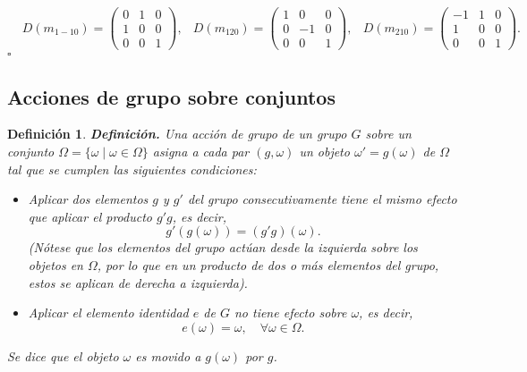 \documentclass{report}
\newtheorem{definition}{Definición}
\begin{document}
{\[\begin{array}{cccc}
&
D(m_{1-10}) = 
\begin{pmatrix} 
0 & 1 & 0 \\ 
1 & 0 & 0 \\ 
0 & 0 & 1 
\end{pmatrix},
&
D(m_{120}) = 
\begin{pmatrix} 
1 & 0 & 0 \\ 
0 & -1 & 0 \\ 
0 & 0 & 1 
\end{pmatrix},
&
D(m_{210}) = 
\begin{pmatrix} 
-1 & 1 & 0 \\ 
1 & 0 & 0 \\ 
0 & 0 & 1 
\end{pmatrix}.
\end{array}
\]
}
\hfill $\square$
\vspace{.4cm}
\subsection{Acciones de grupo sobre conjuntos}

\begin{definition}
\textbf{Definición.} Una \textit{acción de grupo} de un grupo \( G \) sobre un conjunto \( \Omega = \{ \omega \mid \omega \in \Omega \} \) asigna a cada par \( (g, \omega) \) un objeto \( \omega' = g(\omega) \) de \( \Omega \) tal que se cumplen las siguientes condiciones:

\begin{itemize}
    \item[(i)] Aplicar dos elementos \( g \) y \( g' \) del grupo consecutivamente tiene el mismo efecto que aplicar el producto \( g' g \), es decir, 
    \[
    g'(g(\omega)) = (g' g)(\omega).
    \]
    (Nótese que los elementos del grupo actúan \textit{desde la izquierda} sobre los objetos en \( \Omega \), por lo que en un producto de dos o más elementos del grupo, estos se aplican de derecha a izquierda).
    
    \item[(ii)] Aplicar el elemento identidad \( e \) de \( G \) no tiene efecto sobre \( \omega \), es decir,
    \[
    e(\omega) = \omega, \quad \forall \omega \in \Omega.
    \]
\end{itemize}

Se dice que el objeto \( \omega \) es \textit{movido} a \( g(\omega) \) por \( g \).

\end{definition}
\end{document}
